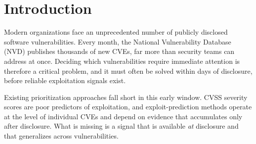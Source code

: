 \documentclass[conference,compsoc]{IEEEtran}
\begin{document}
\begin{abstract}The prioritization of newly discovered vulnerabilities can be challenging because crucial information is often missing in the period that initially follows disclosure. Metric such as the Common Vulnerability Scoring System (CVSS), even if available, does not strongly correlate with the actual likelihood of exploitation. In this paper, we investigate whether the historical exploitability of Common Weakness Enumeration (CWE) categories provides a reliable empirical basis for supporting the early prioritization of newly disclosed Common Vulnerabilities and Exposures (CVEs). We first conduct a large-scale empirical study of 192,788 CVEs, 768 CWE categories, and exploitation evidence from several sources.  Our analysis shows that CWE mappings are stable over time and can serve as a strong predictor of exploitability. This finding motivates, in turn, the creation of a fine-tuned bi-encoder model that automatically maps newly disclosed CVEs to CWE categories by first predicting the main category and then the child, enabling practitioners to leverage historical weakness-level exploitability information immediately after vulnerability disclosure. Experimental results show that this framework enhances CWE categorization and can be used to accurately forecast CVE exploitability.
\end{abstract}

\section{Introduction}

Modern organizations face an unprecedented number of publicly disclosed software vulnerabilities. Every month, the National Vulnerability Database (NVD) publishes thousands of new CVEs, far more than security teams can address at once. Deciding which vulnerabilities require immediate attention is therefore a critical problem, and it must often be solved within days of disclosure, before reliable exploitation signals exist.

Existing prioritization approaches fall short in this early window. CVSS severity scores are poor predictors of exploitation, and exploit-prediction methods operate at the level of individual CVEs and depend on evidence that accumulates only after disclosure. What is missing is a signal that is available \emph{at} disclosure and that generalizes across vulnerabilities.
\end{document}
